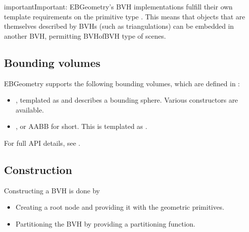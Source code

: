 \documentclass[letterpaper,10pt,english]{sphinxmanual}
\begin{document}
\begin{sphinxadmonition}{important}{Important:}
\sphinxAtStartPar
EBGeometry’s BVH implementations fulfill their own template requirements on the primitive type .
This means that objects that are themselves described by BVHs (such as triangulations) can be embedded in another BVH, permitting BVH\sphinxhyphen{}of\sphinxhyphen{}BVH type of scenes.
\end{sphinxadmonition}


\subsection{Bounding volumes}
\label{\detokenize{ImplemBVH:bounding-volumes}}
\sphinxAtStartPar
EBGeometry supports the following bounding volumes, which are defined in :
\begin{itemize}
\item {} 
\sphinxAtStartPar
{}, templated as  and describes a bounding sphere.
Various constructors are available.

\item {} 
\sphinxAtStartPar
{}, or AABB for short.
This is templated as .

\end{itemize}

\sphinxAtStartPar
For full API details, see .


\subsection{Construction}
\label{\detokenize{ImplemBVH:construction}}\label{\detokenize{ImplemBVH:chap-bvhconstruction}}
\sphinxAtStartPar
Constructing a BVH is done by
\begin{itemize}
\item {} 
\sphinxAtStartPar
Creating a root node and providing it with the geometric primitives.

\item {} 
\sphinxAtStartPar
Partitioning the BVH by providing a partitioning function.

\end{itemize}
\end{document}

